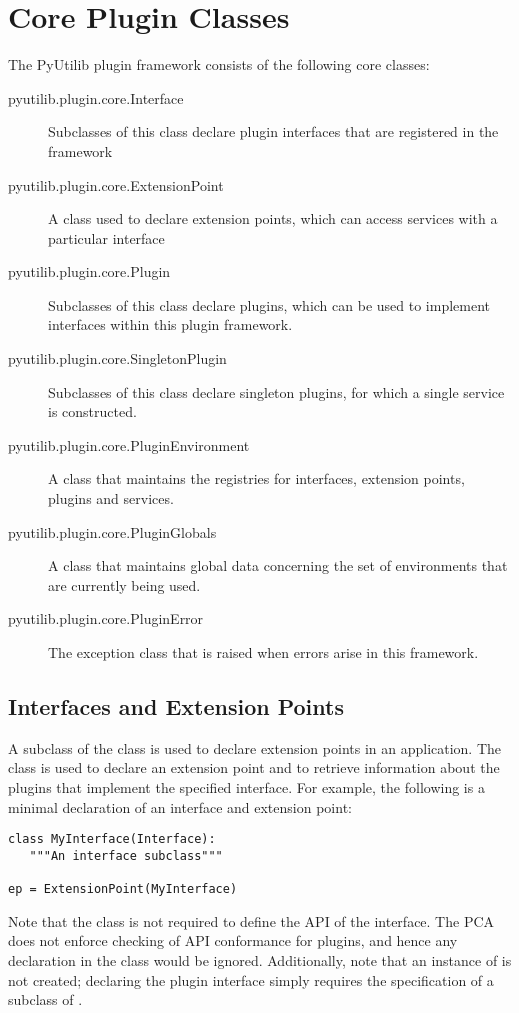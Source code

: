\section{Core Plugin Classes}

The PyUtilib plugin framework consists of the following core classes:
\begin{description}
\item[pyutilib.plugin.core.Interface] Subclasses of this class declare plugin interfaces that are registered in the framework 
\item[pyutilib.plugin.core.ExtensionPoint] A class used to declare extension points, which can access services with a particular interface 
\item[pyutilib.plugin.core.Plugin] Subclasses of this class declare plugins, which can be used to implement interfaces within this plugin framework. 
\item[pyutilib.plugin.core.SingletonPlugin] Subclasses of this class declare singleton plugins, for which a single service is constructed. 
\item[pyutilib.plugin.core.PluginEnvironment] A class that maintains the registries for interfaces, extension points, plugins and services. 
\item[pyutilib.plugin.core.PluginGlobals] A class that maintains global data concerning the set of environments that are currently being used. 
\item[pyutilib.plugin.core.PluginError] The exception class that is raised when errors arise in this framework. 
\end{description}

\subsection{Interfaces and Extension Points}

A subclass of the  class is used to declare extension
points in an application. The  class is used to declare
an extension point and to retrieve information about the plugins that
implement the specified interface. For example, the following is a
minimal declaration of an interface and extension point:
\begin{lstlisting}
class MyInterface(Interface):
   """An interface subclass"""

ep = ExtensionPoint(MyInterface)
\end{lstlisting}
Note that the  class is not required to define the API of the
interface. The PCA does not enforce checking of
API conformance for plugins, and hence any declaration in the 
class would be ignored. Additionally, note that an instance of 
is not created; declaring the plugin interface simply requires the
specification of a subclass of .


